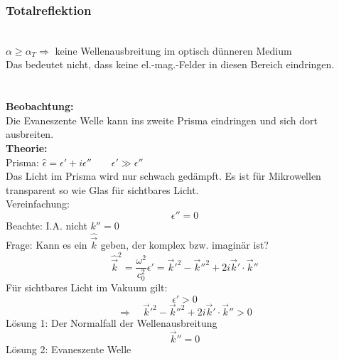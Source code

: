 \subsubsection{Totalreflektion}

\\
$ \alpha \ge \alpha_T \Rightarrow $ keine Wellenausbreitung im optisch dünneren Medium\\[5pt]
Das bedeutet nicht, dass keine el.-mag.-Felder in diesen Bereich eindringen.\\
\\
\\
\textbf{Beobachtung:}\\
Die Evaneszente Welle kann ins zweite Prisma eindringen und sich dort ausbreiten.\\
\textbf{Theorie:}\\
Prisma: $ \hat{\epsilon} = \epsilon' + i \epsilon''  \qquad \epsilon' \gg \epsilon''$\\
Das Licht im Prisma wird nur schwach gedämpft. Es ist für Mikrowellen transparent so wie Glas für sichtbares Licht.\\
Vereinfachung:
\begin{equation*}
\epsilon'' = 0
\end{equation*}
Beachte: I.A. nicht $ k'' = 0 $\\[5pt]
Frage: Kann es ein $ \hat{\vec{k}} $ geben, der komplex bzw. imaginär ist?
\begin{equation*}
\hat{\vec{k}}^2 = \frac{\omega^2}{c_0^2} \epsilon' = \vec{k}'^2 - \vec{k}''^2 + 2 i \vec{k}' \cdot \vec{k}''
\end{equation*}
Für sichtbares Licht im Vakuum gilt:
\begin{equation*}
\epsilon' > 0
\end{equation*}
\begin{equation*}
\Rightarrow \quad \vec{k}'^2 - \vec{k}''^2 + 2 i \vec{k}' \cdot \vec{k}'' > 0
\end{equation*}
Lösung 1: Der Normalfall der Wellenausbreitung
\begin{equation*}
\vec{k}'' = 0
\end{equation*}
Lösung 2: Evaneszente Welle
